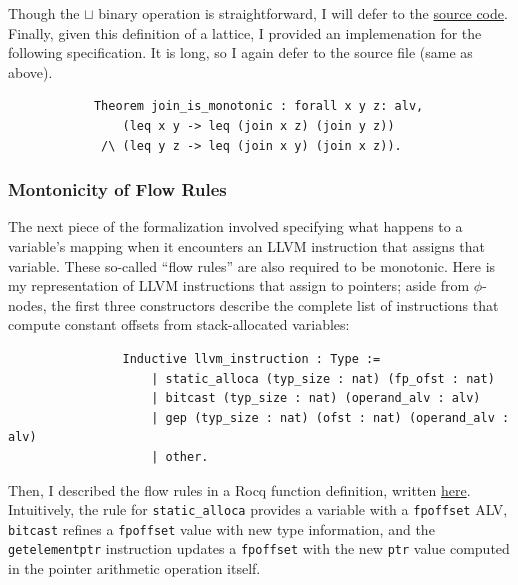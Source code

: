 \documentclass{article}
\begin{document}
            Though the $\sqcup$ binary operation is straightforward, I will 
            defer to the \href{https://github.com/parthsarkar17/softboundcets-ese5370/blob/8be2130a53f6cb4e7e283aeb8e46bc1ba478985f/spa.v#L36}{source code}.
            Finally, given this definition of a lattice, I provided an
            implemenation for the following specification. It is long, so I
            again defer to the source file (same as above).

            \begin{verbatim}
            Theorem join_is_monotonic : forall x y z: alv, 
                (leq x y -> leq (join x z) (join y z))
             /\ (leq y z -> leq (join x y) (join x z)).
            \end{verbatim}

            \subsubsection{Montonicity of Flow Rules}

                The next piece of the formalization involved specifying what
                happens to a variable's mapping when it encounters an LLVM
                instruction that assigns that variable. These so-called ``flow rules''
                are also required to be monotonic. Here is my representation of
                LLVM instructions that assign to pointers; aside from  $\phi$-nodes,
                the first three constructors describe the complete list of instructions that compute constant offsets
                from stack-allocated variables:

                \begin{verbatim}
                Inductive llvm_instruction : Type :=
                    | static_alloca (typ_size : nat) (fp_ofst : nat)
                    | bitcast (typ_size : nat) (operand_alv : alv)
                    | gep (typ_size : nat) (ofst : nat) (operand_alv : alv)
                    | other.
                \end{verbatim}


                Then, I described the flow rules in a Rocq function definition,
                written \href{https://github.com/parthsarkar17/softboundcets-ese5370/blob/8be2130a53f6cb4e7e283aeb8e46bc1ba478985f/spa.v#L113}{here}.
                Intuitively, the rule for \verb|static_alloca| provides a variable with a \verb|fpoffset| ALV,
                \verb|bitcast| refines a \verb|fpoffset| value with new type information,
                and the \verb|getelementptr| instruction updates a \verb|fpoffset| with the new \verb|ptr| value
                computed in the pointer arithmetic operation itself. 
\end{document}
